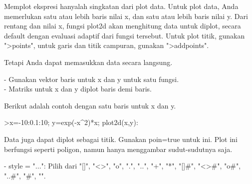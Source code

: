 \documentclass[12pt,arial,letterpaper]{book}
\begin{document}
\begin{eulercomment}
\begin{eulercomment}
\begin{eulercomment}
\begin{eulercomment}
\begin{eulercomment}
\begin{eulercomment}
\begin{eulercomment}
\begin{eulercomment}
\begin{eulercomment}
\begin{eulercomment}
\begin{eulercomment}
\begin{eulercomment}
\begin{eulercomment}
\begin{eulercomment}
\begin{eulercomment}
\begin{eulercomment}
\begin{eulercomment}
Memplot ekspresi hanyalah singkatan dari plot data. Untuk plot data,
Anda memerlukan satu atau lebih baris nilai x, dan satu atau lebih
baris nilai y. Dari rentang dan nilai x, fungsi plot2d akan menghitung
data untuk diplot, secara default dengan evaluasi adaptif dari fungsi
tersebut. Untuk plot titik, gunakan "\textgreater{}points", untuk garis dan titik
campuran, gunakan "\textgreater{}addpoints".

Tetapi Anda dapat memasukkan data secara langsung.

- Gunakan vektor baris untuk x dan y untuk satu fungsi.\\
- Matriks untuk x dan y diplot baris demi baris.

Berikut adalah contoh dengan satu baris untuk x dan y.

\end{eulercomment}
\begin{eulerprompt}
>x=-10:0.1:10; y=exp(-x^2)*x; plot2d(x,y):
\end{eulerprompt}
\begin{eulercomment}
Data juga dapat diplot sebagai titik. Gunakan poin=true untuk ini.
Plot ini berfungsi seperti poligon, namun hanya menggambar
sudut-sudutnya saja.

- style = "...": Pilih dari "[]", "\textless{}\textgreater{}", "o", ".", "..", "+", "*",
"[]#", "\textless{}\textgreater{}#", "o#", "..#", "#", "\textbar{}".


\end{eulercomment}
\end{eulercomment}
\end{eulercomment}
\end{eulercomment}
\end{eulercomment}
\end{eulercomment}
\end{eulercomment}
\end{eulercomment}
\end{eulercomment}
\end{eulercomment}
\end{eulercomment}
\end{eulercomment}
\end{eulercomment}
\end{eulercomment}
\end{eulercomment}
\end{eulercomment}
\end{eulercomment}
\end{document}
